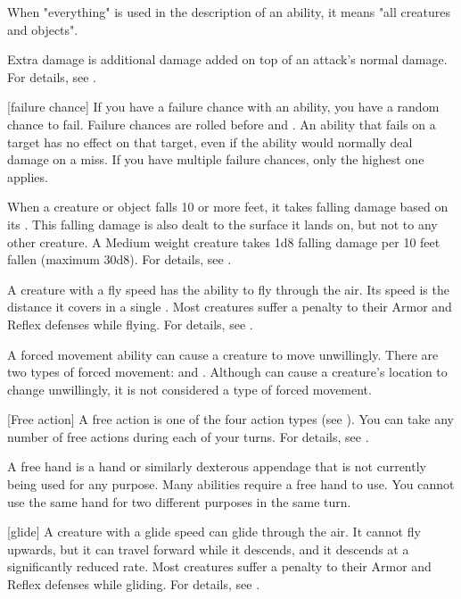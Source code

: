  When "everything" is used in the description of an ability, it means "all creatures and objects".

 Extra damage is additional damage added on top of an attack's normal damage.
For details, see .

[failure chance] If you have a failure chance with an ability, you have a random chance to fail.
Failure chances are rolled before  and .
An ability that fails on a target has no effect on that target, even if the ability would normally deal damage on a miss.
If you have multiple failure chances, only the highest one applies.

 When a creature or object falls 10 or more feet, it takes falling damage based on its .
This falling damage is also dealt to the surface it lands on, but not to any other creature.
A Medium weight creature takes 1d8 falling damage per 10 feet fallen (maximum 30d8).
For details, see .

 A creature with a fly speed has the ability to fly through the air.
Its speed is the distance it covers in a single .
Most creatures suffer a  penalty to their Armor and Reflex defenses while flying.
For details, see .

 A forced movement ability can cause a creature to move unwillingly.
There are two types of forced movement:  and .
Although  can cause a creature's location to change unwillingly, it is not considered a type of forced movement.

[Free action] A free action is one of the four action types (see ).
You can take any number of free actions during each of your turns.
For details, see .

 A free hand is a hand or similarly dexterous appendage that is not currently being used for any purpose.
Many abilities require a free hand to use.
You cannot use the same hand for two different purposes in the same turn.

[glide] A creature with a glide speed can glide through the air.
It cannot fly upwards, but it can travel forward while it descends, and it descends at a significantly reduced rate.
Most creatures suffer a  penalty to their Armor and Reflex defenses while gliding.
For details, see .

